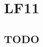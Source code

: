 \chapter{\Huge{LF11}}\label{ch:lf11}
\section{TODO}\label{sec:lf11_first_Section}

\setcounter{section}{0}